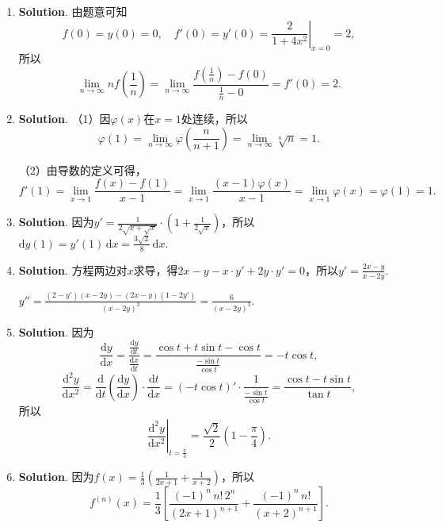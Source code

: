 \documentclass[../main.tex]{subfiles}
\begin{document}
\begin{enumerate}
    \item \textbf{Solution}. 由题意可知
          \[
              f(0)=y(0)=0,\quad f'(0)=y'(0)=\left.\frac{2}{1+4x^{2}}\right|_{x=0}=2,
          \]
          所以
          \[
              \lim_{n\to\infty}nf\left(\frac{1}{n}\right)=\lim_{n\to\infty}\frac{f\left(\frac{1}{n}\right)-f(0)}{\frac{1}{n}-0}=f'(0)=2.
          \]

    \item \textbf{Solution}. （1）因$\varphi(x)$在$x=1$处连续，所以
          \[
              \varphi(1)=\lim_{n\to\infty}\varphi\left(\frac{n}{n+1}\right)=\lim_{n\to\infty}\sqrt[n]{n}=1.
          \]

          （2）由导数的定义可得，
          \[
              f'(1)=\lim_{x\to1}\frac{f(x)-f(1)}{x-1}=\lim_{x\to1}\frac{(x-1)\varphi(x)}{x-1}
              =\lim_{x\to1}\varphi(x)=\varphi(1)=1.
          \]

    \item \textbf{Solution}. 因为$y'=\frac{1}{2\sqrt{x+\sqrt{x}}}\cdot\left(1+\frac{1}{2\sqrt{x}}
              \right)$，所以$\mathrm{d}y(1)=y'(1)\,\mathrm{d}x=\frac{3\sqrt{2}}{8}\,\mathrm{d}
              x$.

    \item \textbf{Solution}. 方程两边对$x$求导，得$2x-y-x\cdot y'+2y\cdot y'=0$，所以$y
              '=\frac{2x-y}{x-2y}$.

          $y''=\frac{(2-y')(x-2y)-(2x-y)(1-2y')}{(x-2y)^{2}}=\frac{6}{(x-2y)^{3}}$.

    \item \textbf{Solution}. 因为
          \[
              \frac{\mathrm{d}y}{\mathrm{d}x}=\frac{\frac{\mathrm{d}y}{\mathrm{d}t}}{\frac{\mathrm{d}x}{\mathrm{d}t}}
              =\frac{\cos t+t\sin t-\cos t}{\frac{-\sin t}{\cos t}}=-t\cos t,
          \]
          \[
              \frac{\mathrm{d}^{2}y}{\mathrm{d}x^{2}}=\frac{\mathrm{d}}{\mathrm{d}t}\left
              (\frac{\mathrm{d}y}{\mathrm{d}x}\right)\cdot\frac{\mathrm{d}t}{\mathrm{d}x}
              =\left(-t\cos t\right)'\cdot\frac{1}{\frac{-\sin t}{\cos t}}=\frac{\cos t- t\sin
                  t}{\tan t},
          \]
          所以
          \[
              \left.\frac{\mathrm{d}^{2} y}{\mathrm{d}x^{2}}\right|_{t=\frac{\pi}{4}}
              =\frac{\sqrt{2}}{2}\left(1-\frac{\pi}{4}\right).
          \]

    \item \textbf{Solution}. 因为$f(x)=\frac{1}{3}\left(\frac{1}{2x+1}+\frac{1}{x+2}\right
              )$，所以
          \[
              f^{(n)}(x)=\frac{1}{3}\left[\frac{(-1)^{n}\,n!\,2^{n}}{(2x+1)^{n+1}}+\frac{(-1)^{n}\,n!}{(x+2)^{n+1}}
                  \right].
          \]


\end{enumerate}
\end{document}
